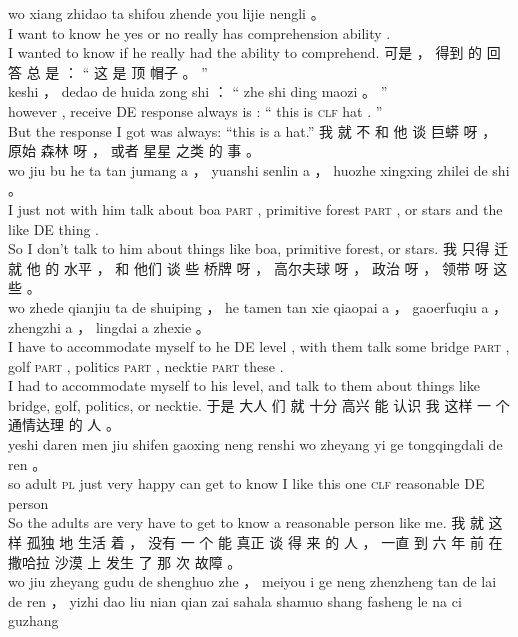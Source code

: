 \documentclass[UTF8]{ctexart}
\begin{document}
\begin{exe}
wo xiang zhidao ta shifou zhende you lijie nengli 。
\\
I {want to} know he {yes or no} really has comprehension ability .
\\
\trans I wanted to know if he really had the ability to comprehend. 
\ex
\glll
可是 ， 得到 的 回答 总 是 ： “ 这 是 顶 帽子 。 ”
\\
keshi ， dedao de huida zong shi ： “ zhe shi ding maozi 。 ”
\\
however , receive DE response always is : `` this is \textsc{clf} hat . ''
\\
\trans But the response I got was always: ``this is a hat.''
\ex
\glll
我 就 不 和 他 谈 巨蟒 呀 ， 原始 森林 呀 ， 或者 星星 之类 的 事 。
\\
wo jiu bu he ta tan jumang a ， yuanshi senlin a ， huozhe xingxing zhilei de shi 。
\\
I just not with him {talk about} boa \textsc{part} , primitive forest \textsc{part} , or stars {and the like} DE thing .
\\
\trans So I don't talk to him about things like boa, primitive forest, or stars. 
\ex
\glll
我 只得 迁就 他 的 水平 ， 和 他们 谈 些 桥牌 呀 ， 高尔夫球 呀 ， 政治 呀 ， 领带 呀 这些 。
\\
wo zhede qianjiu ta de shuiping ， he tamen tan xie qiaopai a ， gaoerfuqiu a ， zhengzhi a ， lingdai a zhexie 。
\\
I {have to} {accommodate myself to} he DE level , with them  talk some bridge \textsc{part} , golf \textsc{part} , politics \textsc{part} , necktie \textsc{part} these .
\\
\trans I had to accommodate myself to his level, and talk to them about things like bridge, golf, politics, or necktie. 
\ex
\glll
于是 大人 们 就 十分 高兴 能 认识 我 这样 一 个 通情达理 的 人 。
\\
yeshi daren men jiu shifen gaoxing neng renshi wo zheyang yi ge tongqingdali de ren 。
\\
so adult \textsc{pl} just very happy can {get to know} I  {like this} one \textsc{clf} reasonable DE person
\\
\trans So the adults are very have to get to know a reasonable person like me. 
\ex
\glll
我 就 这样 孤独 地 生活 着 ， 没有 一 个 能 真正 谈 得 来 的 人 ， 一直 到 六 年 前 在 撒哈拉 沙漠 上 发生 了 那 次 故障 。
\\
wo jiu zheyang gudu de shenghuo zhe ， meiyou i ge neng zhenzheng tan de lai de ren ， yizhi dao liu nian qian zai sahala shamuo shang fasheng le na ci guzhang

\end{exe}
\end{document}
